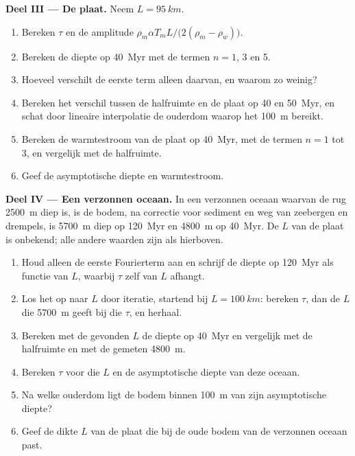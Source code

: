 \begin{problem}
\medskip\noindent\textbf{Deel III --- De plaat.} Neem $L = \qty{95}{km}$.
\begin{enumerate}[resume]
  \item Bereken $\tau$ en de amplitude $\rho_m\alpha T_mL/\bigl(2(\rho_m -
        \rho_w)\bigr)$.
  \item Bereken de diepte op \qty{40}{Myr} met de termen $n = 1$, 3 en 5.
  \item Hoeveel verschilt de eerste term alleen daarvan, en waarom zo
        weinig?
  \item Bereken het verschil tussen de halfruimte en de plaat op 40 en
        \qty{50}{Myr}, en schat door lineaire interpolatie de ouderdom waarop
        het \qty{100}{m} bereikt.
  \item Bereken de warmtestroom van de plaat op \qty{40}{Myr}, met de termen
        $n = 1$ tot 3, en vergelijk met de halfruimte.
  \item Geef de asymptotische diepte en warmtestroom.
\end{enumerate}

\medskip\noindent\textbf{Deel IV --- Een verzonnen oceaan.} In een verzonnen oceaan
waarvan de rug \qty{2500}{m} diep is, is de bodem, na correctie voor sediment
en weg van zeebergen en drempels, is \qty{5700}{m} diep op \qty{120}{Myr} en
\qty{4800}{m} op \qty{40}{Myr}. De $L$ van de plaat is onbekend; alle andere
waarden zijn als hierboven.
\begin{enumerate}[resume]
  \item Houd alleen de eerste Fourierterm aan en schrijf de diepte op
        \qty{120}{Myr} als functie van $L$, waarbij $\tau$ zelf van
        $L$ afhangt.
  \item Los het op naar $L$ door iteratie, startend bij $L = \qty{100}{km}$:
        bereken $\tau$, dan de $L$ die \qty{5700}{m} geeft bij die
        $\tau$, en herhaal.
  \item Bereken met de gevonden $L$ de diepte op \qty{40}{Myr} en vergelijk
        met de halfruimte en met de gemeten \qty{4800}{m}.
  \item Bereken $\tau$ voor die $L$ en de asymptotische diepte van deze oceaan.
  \item Na welke ouderdom ligt de bodem binnen \qty{100}{m} van zijn
        asymptotische diepte?
  \item Geef de dikte $L$ van de plaat die bij de oude bodem van de
        verzonnen oceaan past.
\end{enumerate}
\end{problem}
